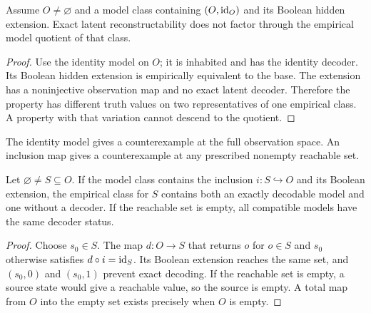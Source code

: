 \begin{theorem}
Assume \(O\neq\varnothing\) and a model class containing \((O,\operatorname{id}_O)\) and its Boolean hidden extension. Exact latent reconstructability does not factor through the empirical model quotient of that class.
\label{thm:decoderdoesnotdescend}
\end{theorem}

\begin{proof}
Use the identity model on \(O\); it is inhabited and has the identity decoder. Its Boolean hidden extension is empirically equivalent to the base. The extension has a noninjective observation map and no exact latent decoder. Therefore the property has different truth values on two representatives of one empirical class. A property with that variation cannot descend to the quotient.
\end{proof}
The identity model gives a counterexample at the full observation space. An inclusion map gives a counterexample at any prescribed nonempty reachable set.

\begin{corollary}
Let \(\varnothing\ne S\subseteq O\). If the model class contains the inclusion \(i:S\hookrightarrow O\) and its Boolean extension, the empirical class for \(S\) contains both an exactly decodable model and one without a decoder. If the reachable set is empty, all compatible models have the same decoder status.
\end{corollary}

\begin{proof}
Choose \(s_0\in S\). The map \(d:O\to S\) that returns \(o\) for \(o\in S\) and \(s_0\) otherwise satisfies \(d\circ i=\operatorname{id}_S\). Its Boolean extension reaches the same set, and \((s_0,0)\) and \((s_0,1)\) prevent exact decoding. If the reachable set is empty, a source state would give a reachable value, so the source is empty. A total map from \(O\) into the empty set exists precisely when \(O\) is empty.
\end{proof}

